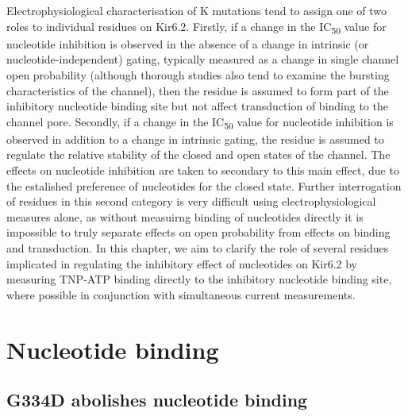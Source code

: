 Electrophysiological characterisation of K\ATP{} mutations tend to assign one of two roles to individual residues on Kir6.2.
Firstly, if a change in the IC\textsubscript{50} value for nucleotide inhibition is observed in the absence of a change in intrinsic (or nucleotide-independent) gating, typically measured as a change in single channel open probability (although thorough studies also tend to examine the bursting characteristics of the channel), then the residue is assumed to form part of the inhibitory nucleotide binding site but not affect transduction of binding to the channel pore.
Secondly, if a change in the IC\textsubscript{50} value for nucleotide inhibition is observed in addition to a change in intrinsic gating, the residue is assumed to regulate the relative stability of the closed and open states of the channel.
The effects on nucleotide inhibition are taken to secondary to this main effect, due to the estalished preference of nucleotides for the closed state.
Further interrogation of residues in this second category is very difficult using electrophysiological measures alone, as without measuirng binding of nucleotides directly it is impossible to truly separate effects on open probability from effects on binding and transduction.
In this chapter, we aim to clarify the role of several residues implicated in regulating the inhibitory effect of nucleotides on Kir6.2 by measuring TNP-ATP
binding directly to the inhibitory nucleotide binding site, where possible in conjunction with simultaneous current measurements.

\section{Nucleotide binding}

\subsection{G334D abolishes nucleotide binding}

